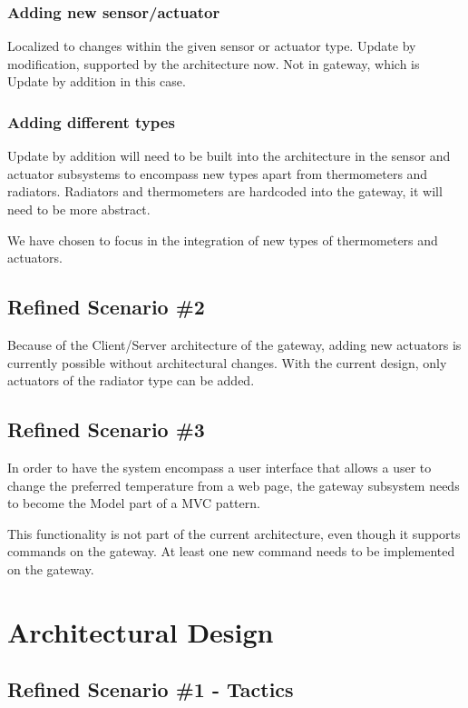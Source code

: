 \documentclass[a4paper,10pt]{article}
\begin{document}
\subsubsection{Adding new sensor/actuator}
Localized to changes within the given sensor or actuator type. Update by modification, supported by the architecture now. Not in gateway, which is Update by addition in this case. 

\subsubsection{Adding different types}
Update by addition will need to be built into the architecture in the sensor and actuator subsystems to encompass new types apart from thermometers and radiators. Radiators and thermometers are hardcoded into the gateway, it will need to be more abstract.

We have chosen to focus in the integration of new types of thermometers and actuators.


\subsection{Refined Scenario \#2}
Because of the Client/Server architecture of the gateway, adding new actuators is currently possible without architectural changes. With the current design, only actuators of the radiator type can be added.

\subsection{Refined Scenario \#3}
In order to have the system encompass a user interface that allows a user to change the preferred temperature from a web page, the gateway subsystem needs to become the Model part of a MVC pattern.

This functionality is not part of the current architecture, even though it supports commands on the gateway. At least one new command needs to be implemented on the gateway.

\section{Architectural Design}

\subsection{Refined Scenario \#1 - Tactics}
\end{document}
